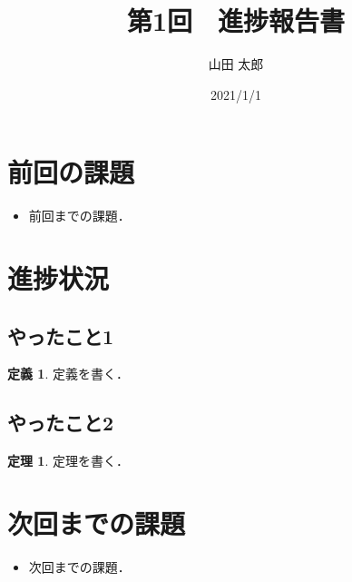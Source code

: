 \documentclass[10pt,a4paper]{jarticle}  %
\theoremstyle{definition}
\newtheorem{definition}{定義}
\newtheorem{theorem}{定理}
\begin{document}
\title{第1回　進捗報告書}
\author{山田 太郎}
\date{2021/1/1}
\maketitle

\section{前回の課題}
\begin{itemize}
    \item 前回までの課題\cite{guo2022pid}．
\end{itemize}

\section{進捗状況}
\subsection{やったこと1}
\begin{definition}
    定義を書く．
\end{definition}


\subsection{やったこと2}
\begin{theorem}
    定理を書く．
\end{theorem}

\section{次回までの課題}
\begin{itemize}
    \item 次回までの課題．
\end{itemize}

\end{document}

